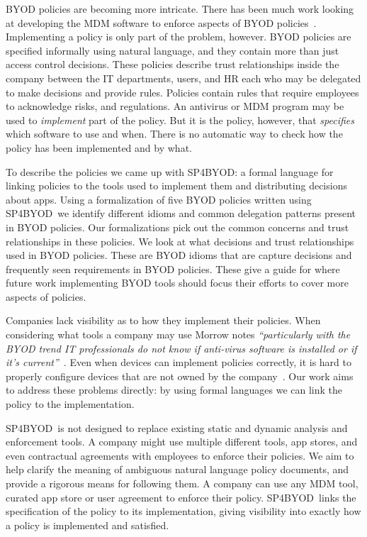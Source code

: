 \documentclass{llncs}
\newcommand{\AppPAL}[0]{SP4BYOD}
\begin{document}
BYOD policies are becoming more intricate.
There has been much work looking at developing the \ac{MDM} software to enforce aspects of BYOD policies~\cite{costantino_towards_2013,martinelli_enhancing_2016,armando_enabling_2014}.
Implementing a policy is only part of the problem, however.
BYOD policies are specified informally using natural language, and they contain more than just access control decisions.
These policies describe trust relationships inside the company between the IT departments, users, and HR each who may be delegated to make decisions and provide rules.
Policies contain rules that require employees to acknowledge risks, and regulations.
An antivirus or \ac{MDM} program may be used to \emph{implement} part of the policy.
But it is the policy, however, that \emph{specifies} which software to use and when. 
There is no automatic way to check how the policy has been implemented and by what.

To describe the policies we came up with \AppPAL{}: 
  a formal language for linking policies to the tools used to implement them and distributing decisions about apps.
Using a formalization of five BYOD policies written using \AppPAL~we identify different idioms and common delegation patterns present in BYOD policies.
Our formalizations pick out the common concerns and trust relationships in these policies.
We look at what decisions and trust relationships used in BYOD policies.
These are BYOD idioms that are capture decisions and frequently seen requirements in BYOD policies.
These give a guide for where future work implementing BYOD tools should focus their efforts to cover more aspects of policies.

Companies lack visibility as to how they implement their policies.
When considering what tools a company may use Morrow notes \emph{``particularly with the BYOD trend IT professionals do not know if anti-virus software is installed or if it's current''}~\cite{morrow_byod_2012}.
Even when devices can implement policies correctly, it is hard to properly configure devices that are not owned by the company~\cite{tokuyoshi_security_2013}.
Our work aims to address these problems directly: by using formal languages we can link the policy to the implementation.

\AppPAL~is not designed to replace existing static and dynamic analysis and enforcement tools.
A company might use multiple different tools, app stores, and even contractual agreements with employees to enforce their policies.
We aim to help clarify the meaning of ambiguous natural language policy documents, and provide a rigorous means for following them.
A company can use any \ac{MDM} tool, curated app store or user agreement to enforce their policy.
\AppPAL~links the specification of the policy to its implementation, giving visibility into exactly how a policy is implemented and satisfied.
\end{document}
